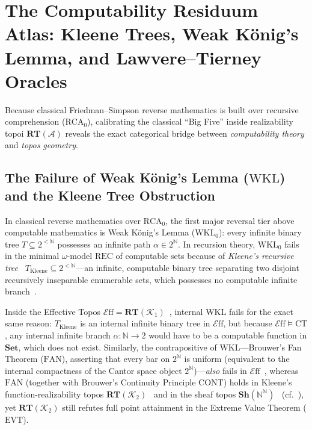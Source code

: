 \documentclass[10pt,twoside,openright]{book}
\theoremstyle{crmplain}
\theoremstyle{crmdef}
\theoremstyle{crmremark}
\newcommand{\Eff}{\mathcal{E}\mathrm{ff}}
\begin{document}
\section{The Computability Residuum Atlas: Kleene Trees, Weak König's Lemma, and Lawvere--Tierney Oracles}\label{sec:ltt-topologies}

Because classical Friedman--Simpson reverse mathematics is built over recursive comprehension ($\mathrm{RCA}_0$), calibrating the classical ``Big Five'' inside realizability topoi $\mathbf{RT}(\mathcal{A})$ reveals the exact categorical bridge between \emph{computability theory} and \emph{topos geometry}.

\subsection{\texorpdfstring{The Failure of Weak König's Lemma ($\mathrm{WKL}$) and the Kleene Tree Obstruction}{The Failure of Weak König's Lemma (WKL) and the Kleene Tree Obstruction}}

In classical reverse mathematics over $\mathrm{RCA}_0$, the first major reversal tier above computable mathematics is Weak König's Lemma ($\mathrm{WKL}_0$): every infinite binary tree $T \subseteq 2^{<\mathbb{N}}$ possesses an infinite path $\alpha \in 2^{\mathbb{N}}$. In recursion theory, $\mathrm{WKL}_0$ fails in the minimal $\omega$-model $\mathrm{REC}$ of computable sets because of \emph{Kleene's recursive tree}~\cite{Kleene52} $T_{\mathrm{Kleene}} \subseteq 2^{<\mathbb{N}}$---an infinite, computable binary tree separating two disjoint recursively inseparable enumerable sets, which possesses no computable infinite branch~\cite[\S IV.1, \S VIII.2]{Simpson09}.

Inside the Effective Topos $\Eff = \mathbf{RT}(\mathcal{K}_1)$~\cite{Hyland82}, internal $\mathrm{WKL}$ fails for the exact same reason: $T_{\mathrm{Kleene}}$ is an internal infinite binary tree in $\Eff$, but because $\Eff \models \mathrm{CT}$, any internal infinite branch $\alpha: \mathbb{N} \to 2$ would have to be a computable function in $\mathbf{Set}$, which does not exist. Similarly, the contrapositive of $\mathrm{WKL}$---Brouwer's Fan Theorem ($\mathrm{FAN}$), asserting that every bar on $2^{\mathbb{N}}$ is uniform (equivalent to the internal compactness of the Cantor space object $2^{\mathbb{N}}$)---\emph{also} fails in $\Eff$~\cite[\S 3.2]{vanOosten08}, whereas $\mathrm{FAN}$ (together with Brouwer's Continuity Principle $\mathrm{CONT}$) holds in Kleene's function-realizability topos $\mathbf{RT}(\mathcal{K}_2)$~\cite[\S 4.3]{vanOosten08} and in the sheaf topos $\mathbf{Sh}(\mathbb{N}^\mathbb{N})$~\cite[Theorem~3.2]{FourmanHyland79} (cf.~\cite{LietzStreicher12}), yet $\mathbf{RT}(\mathcal{K}_2)$ still refutes full point attainment in the Extreme Value Theorem ($\mathrm{EVT}$).
\end{document}
